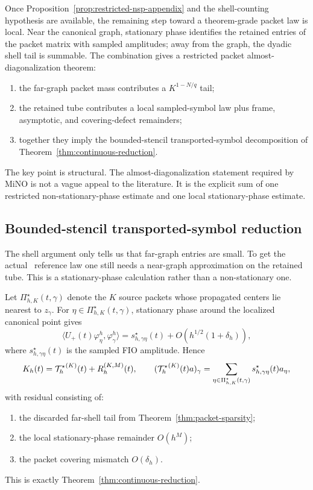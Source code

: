 Once Proposition~\ref{prop:restricted-nsp-appendix} and the shell-counting hypothesis are available, the remaining step toward a theorem-grade packet law is local. Near the canonical graph, stationary phase identifies the retained entries of the packet matrix with sampled amplitudes; away from the graph, the dyadic shell tail is summable. The combination gives a restricted packet almost-diagonalization theorem:
\begin{enumerate}
\item the far-graph packet mass contributes a $K^{1-N/q}$ tail;
\item the retained tube contributes a local sampled-symbol law plus frame, asymptotic, and covering-defect remainders;
\item together they imply the bounded-stencil transported-symbol decomposition of Theorem~\ref{thm:continuous-reduction}.
\end{enumerate}
The key point is structural. The almost-diagonalization statement required by MiNO is not a vague appeal to the literature. It is the explicit sum of one restricted non-stationary-phase estimate and one local stationary-phase estimate.

\subsection{Bounded-stencil transported-symbol reduction}

The shell argument only tells us that far-graph entries are small. To get the actual \MiNO\ reference law one still needs a near-graph approximation on the retained tube. This is a stationary-phase calculation rather than a non-stationary one.

Let $\Pi_{h,K}^\star(t,\gamma)$ denote the $K$ source packets whose propagated centers lie nearest to $z_\gamma$. For $\eta\in\Pi_{h,K}^\star(t,\gamma)$, stationary phase around the localized canonical point gives
\[
\langle U_+(t)\varphi_\eta^h,\varphi_\gamma^h\rangle
=
s_{h,\gamma\eta}^\star(t)
+ O(h^{1/2}(1+\delta_h)),
\]
where $s_{h,\gamma\eta}^\star(t)$ is the sampled FIO amplitude. Hence
\[
K_h(t)
=
{\mathcal T^\star_h}^{(K)}(t)+R_h^{(K,M)}(t),
\qquad
({\mathcal T^\star_h}^{(K)}(t)a)_\gamma
=
\sum_{\eta\in\Pi_{h,K}^\star(t,\gamma)} s_{h,\gamma\eta}^\star(t)a_\eta,
\]
with residual consisting of:
\begin{enumerate}
\item the discarded far-shell tail from Theorem~\ref{thm:packet-sparsity};
\item the local stationary-phase remainder $O(h^M)$;
\item the packet covering mismatch $O(\delta_h)$.
\end{enumerate}
This is exactly Theorem~\ref{thm:continuous-reduction}.

